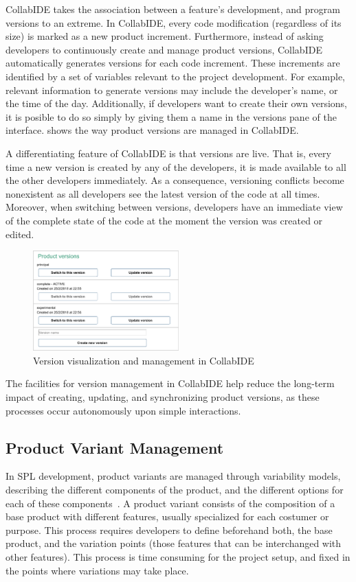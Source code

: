CollabIDE takes the association between a feature's development, and program versions to an 
extreme. In CollabIDE, every code modification (regardless of its size) is marked as a new product 
increment. Furthermore, instead of asking developers to continuously create and manage product 
versions, CollabIDE automatically generates versions for each code increment. These increments are 
identified by a set of variables relevant to the project development. For example, relevant information 
to generate versions may include the developer's name, or the time of the day. Additionally, if 
developers want to create their own versions, it is posible to do so simply by giving them a name in 
the versions pane of the interface.  shows the way product versions are 
managed in CollabIDE. 

A differentiating feature of CollabIDE is that versions are live. That is, every time a new version is 
created by any of the developers, it is made available to all the other developers immediately. 
As a consequence, versioning conflicts become nonexistent as all developers see the latest 
version of the code at all times. Moreover, when switching between versions, developers have an 
immediate view of the complete state of the code at the moment the version was created or edited. 

\begin{figure}[tbp]
  \centering
  \includegraphics[width=0.5\textwidth]{img/fig4-collabIDEVersionManagement}
  \caption{Version visualization and management in CollabIDE}
  \label{fig:versions}
\end{figure}

The facilities for version management in CollabIDE help reduce the long-term impact of creating, 
updating, and synchronizing product versions, as these processes occur autonomously upon simple 
interactions.

\subsection{Product Variant Management}
\label{sec:product-variant}
In \ac{SPL} development, product variants are managed through variability models, describing the 
different components of the product, and the different options for each of these 
components~\cite{pohl05}. A product variant consists of the composition of a base product with 
different features, usually specialized for each costumer or purpose. This process requires developers 
to define beforehand both, the base product, and the variation points (\ie those features that can be 
interchanged with other features). This process is time consuming for the project setup, and fixed in 
the points where variations may take place.

